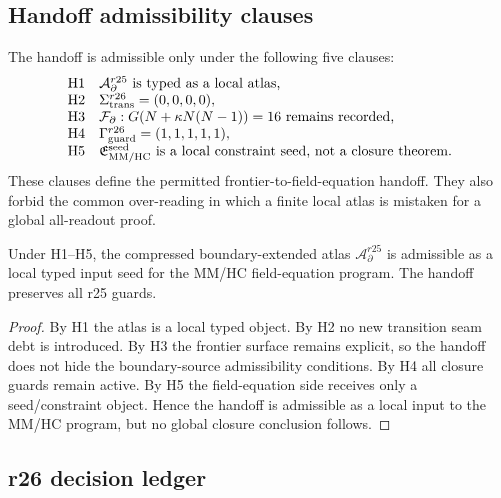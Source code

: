 \subsection{Handoff admissibility clauses}
\label{subsec:v470-r26-handoff-admissibility-clauses}

The handoff is admissible only under the following five clauses:
\[
\begin{array}{ll}
\mathrm{H1} & \mathcal A_{\partial}^{r25}\text{ is typed as a local atlas,}\\
\mathrm{H2} & \Sigma_{\rm trans}^{r26}=(0,0,0,0),\\
\mathrm{H3} & \mathcal F_{\partial}:G(N+\kappa N(N-1))=16\text{ remains recorded,}\\
\mathrm{H4} & \Gamma_{\rm guard}^{r26}=(1,1,1,1,1),\\
\mathrm{H5} & \mathfrak E_{\rm MM/HC}^{\rm seed}\text{ is a local constraint seed, not a closure theorem.}
\end{array}
\]
These clauses define the permitted frontier-to-field-equation handoff.  They
also forbid the common over-reading in which a finite local atlas is mistaken
for a global all-readout proof.

\begin{theoremlet}
\label{thmlet:v470-r26-guarded-atlas-field-handoff}
Under H1--H5, the compressed boundary-extended atlas
\(\mathcal A_{\partial}^{r25}\) is admissible as a local typed input seed for the
MM/HC field-equation program.  The handoff preserves all r25 guards.
\end{theoremlet}

\begin{proof}
By H1 the atlas is a local typed object.  By H2 no new transition seam debt is
introduced.  By H3 the frontier surface remains explicit, so the handoff does
not hide the boundary-source admissibility conditions.  By H4 all closure guards
remain active.  By H5 the field-equation side receives only a seed/constraint
object.  Hence the handoff is admissible as a local input to the MM/HC program,
but no global closure conclusion follows.
\end{proof}

\subsection{r26 decision ledger}
\label{subsec:v470-r26-decision-ledger}

